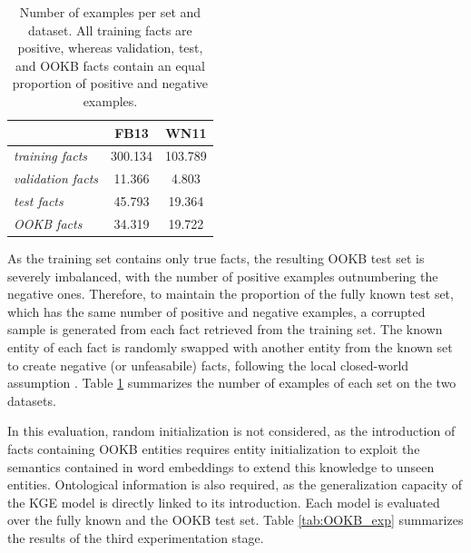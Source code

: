 \begin{table} 
\centering
\begin{tabular}{l|c|c|}
\cline{2-3}
\textit{}                                       & FB13    & WN11    \\ \hline
\multicolumn{1}{|l|}{\textit{training facts}}   & 300.134 & 103.789 \\ \hline
\multicolumn{1}{|l|}{\textit{validation facts}} & 11.366  & 4.803   \\ \hline
\multicolumn{1}{|l|}{\textit{test facts}}       & 45.793  & 19.364  \\ \hline
\multicolumn{1}{|l|}{\textit{OOKB facts}}      & 34.319  & 19.722  \\ \hline
\end{tabular}
\caption{Number of examples per set and dataset. All training facts are positive, whereas validation, test, and OOKB facts contain an equal proportion of positive and negative examples.}
\label{tab:OOKB_proportions}
\end{table}

As the training set contains only true facts, the resulting OOKB test set is severely imbalanced, with the number of positive examples outnumbering the negative ones. Therefore, to maintain the proportion of the fully known test set, which has the same number of positive and negative examples, a corrupted sample is generated from each fact retrieved from the training set. The known entity of each fact is randomly swapped with another entity from the known set to create negative (or unfeasabile) facts, following the local closed-world assumption \citep{Reiter1978}. Table \ref{tab:OOKB_proportions} summarizes the number of examples of each set on the two datasets.

In this evaluation, random initialization is not considered, as the introduction of facts containing OOKB entities requires entity initialization to exploit the semantics contained in word embeddings to extend this knowledge to unseen entities. Ontological information is also required, as the generalization capacity of the KGE model is directly linked to its introduction. Each model is evaluated over the fully known and the OOKB test set. Table \ref{tab:OOKB_exp} summarizes the results of the third experimentation stage.

